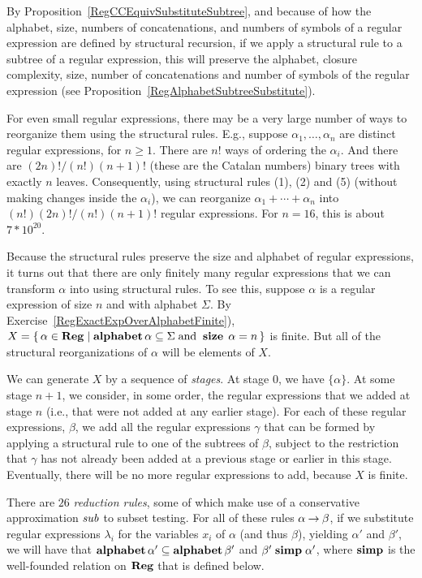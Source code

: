By Proposition~\ref{RegCCEquivSubstituteSubtree}, and because of how
the alphabet, size, numbers of concatenations, and numbers of symbols
of a regular expression are defined by structural recursion, if we
apply a structural rule to a subtree of a regular expression, this
will preserve the alphabet, closure complexity, size, number of
concatenations and number of symbols of the regular expression
(see Proposition~\ref{RegAlphabetSubtreeSubstitute}).

For even small regular expressions, there may be a very large number
of ways to reorganize them using the structural rules. E.g., suppose
$\alpha_1,\ldots,\alpha_n$ are distinct regular expressions, for
$n\geq 1$. There are $n!$ ways of ordering the $\alpha_i$.  And there
are $(2n)! / (n!)(n+1)!$ (these are the Catalan numbers) binary trees
with exactly $n$ leaves. Consequently, using structural rules (1), (2)
and (5) (without making changes inside the $\alpha_i$), we can
reorganize $\alpha_1+\cdots+\alpha_n$ into $(n!)(2n)! / (n!)(n+1)!$
regular expressions. For $n=16$, this is about $7*10^{20}$.

Because the structural rules preserve the size and alphabet of regular
expressions, it turns out that there are only finitely many regular
expressions that we can transform $\alpha$ into using structural
rules. To see this, suppose $\alpha$ is a regular expression of size
$n$ and with alphabet $\Sigma$. By
Exercise~\ref{RegExactExpOverAlphabetFinite}),
$X = \{ \, \alpha\in\mathbf{Reg} \mid \mathbf{alphabet}\,\alpha\subseteq\Sigma \;\allowbreak\mbox{and}\allowbreak\;
  \mathrel{\mathbf{size}}\,\alpha = n \, \}$ is finite.  But all of the structural
reorganizations of $\alpha$ will be elements of $X$.

We can generate $X$ by a sequence of \emph{stages}.  At stage $0$, we
have $\{\alpha\}$. At some stage $n+1$, we consider, in some order,
the regular expressions that we added at stage $n$ (i.e., that were
not added at any earlier stage). For each of these regular
expressions, $\beta$, we add all the regular expressions $\gamma$ that
can be formed by applying a structural rule to one of the subtrees of
$\beta$, subject to the restriction that $\gamma$ has not already been
added at a previous stage or earlier in this stage.  Eventually, there
will be no more regular expressions to add, because $X$ is finite.

There are $26$ \emph{reduction rules}, some of which make use of a
%
%
%
conservative approximation ${\it sub}$ to subset testing. For all of these
rules $\alpha\mathbin{\to}\beta$, if we substitute regular expressions
$\lambda_i$ for the variables $x_i$ of $\alpha$ (and thus $\beta$),
yielding $\alpha'$ and $\beta'$, we will have that
$\mathbf{alphabet}\,\alpha'\subseteq\mathbf{alphabet}\,\beta'$ and $\beta'\mathrel{\mathbf{simp}}\alpha'$,
where $\mathrel{\mathbf{simp}}$ is the well-founded relation on $\mathbf{Reg}$ that is defined
below.

